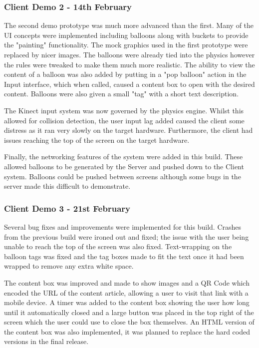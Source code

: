 \subsubsection{Client Demo 2 - 14th February}
The second demo prototype was much more advanced than the first. Many of the UI
concepts were implemented including balloons along with buckets to provide the 
"painting" functionality. The mock graphics used in the first prototype were 
replaced by nicer images. The balloons were already tied into the physics 
however the rules were tweaked to make them much more realistic. The ability to
view the content of a balloon was also added by putting in a "pop balloon" 
action in the Input interface, which when called, caused a content box to open
with the desired content. Balloons were also given a small "tag" with a short
text description.

The Kinect input system was now governed by the physics engine. Whilst this 
allowed for collision detection, the user input lag added caused the client 
some distress as it ran very slowly on the target hardware. Furthermore, the
client had issues reaching the top of the screen on the target hardware.

Finally, the networking features of the system were added in this build. These
allowed balloons to be generated by the Server and pushed down to the Client 
system. Balloons could be pushed between screens although some bugs in the 
server made this difficult to demonstrate.

\subsubsection{Client Demo 3 - 21st February}
Several bug fixes and improvements were implemented for this build. Crashes 
from the previous build were ironed out and fixed; the issue with the user 
being unable to reach the top of the screen was also fixed. Text-wrapping on 
the balloon tags was fixed and the tag boxes made to fit the text once it had
been wrapped to remove any extra white space.

The content box was improved and made to show images and a QR Code which 
encoded the URL of the content article, allowing a user to visit that link with
a mobile device. A timer was added to the content box showing the user how long
until it automatically closed and a large button was placed in the top right of
the screen which the user could use to close the box themselves. An HTML 
version of the content box was also implemented, it was planned to replace the
hard coded versions in the final release. 

